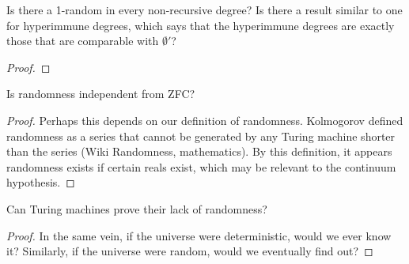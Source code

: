 \begin{question}
  Is there a 1-random in every non-recursive degree? Is there a result
  similar to one for hyperimmune degrees, which says that the
  hyperimmune degrees are exactly those that are comparable with
  $\emptyset'$?
\end{question}
\begin{proof}
\end{proof}

\begin{question}
  Is randomness independent from ZFC?
\end{question}
\begin{proof}
  Perhaps this depends on our definition of randomness. Kolmogorov defined
  randomness as a series that cannot be generated by any Turing machine
  shorter than the series (Wiki Randomness, mathematics). By this
  definition, it appears randomness exists if certain reals exist, which
  may be relevant to the continuum hypothesis.
\end{proof}

\begin{question}
  Can Turing machines prove their lack of randomness?
\end{question}
\begin{proof}
  In the same vein, if the universe were deterministic, would we ever know
  it? Similarly, if the universe were random, would we eventually find out?
\end{proof}
